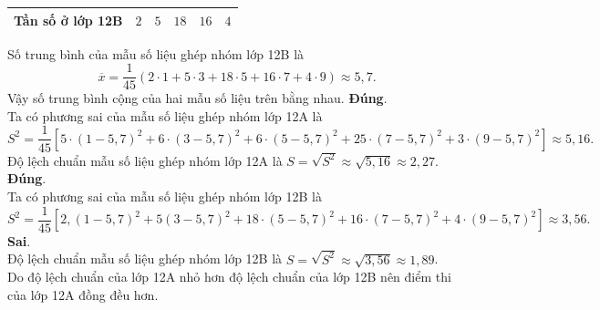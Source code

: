 \begin{ex}
{\begin{itemchoice}
\begin{center}
\begin{tabular}{|c|c|c|c|c|c|}
						\hline
						Tần số ở lớp 12B&$2$&$5$&$18$&$16$&$4$\\
						\hline			
					\end{tabular}
				\end{center}
				Số trung bình của mẫu số liệu ghép nhóm lớp 12B là				
				\[\overline{x}=\dfrac{1}{45}\left(2\cdot 1+5\cdot 3+18\cdot 5+16\cdot 7+4\cdot 9 \right)
				\approx 5{,}7.\]
				Vậy số trung bình cộng của hai mẫu số liệu trên bằng nhau.
				\itemch \textbf{Đúng}.\\
				Ta có phương sai của mẫu số liệu ghép nhóm lớp 12A là\\
				\[S^2=\dfrac{1}{45}\left[ 
				  5\cdot (1-5{,}7)^2
				+ 6\cdot (3-5{,}7)^2
				+ 6\cdot (5-5{,}7)^2
				+25\cdot (7-5{,}7)^2
				+ 3\cdot (9-5{,}7)^2 \right]
				\approx 5{,}16.\]
				Độ lệch chuẩn mẫu số liệu ghép nhóm lớp 12A là $S=\sqrt{S^2}\approx \sqrt{5{,}16}\approx 2{,}27$.
				\itemch \textbf{Đúng}.\\
				Ta có phương sai của mẫu số liệu ghép nhóm lớp 12B là
				\[S^2=\dfrac{1}{45}\left[ 2{,}(1-5{,}7)^2+5(3-5{,}7)^2+18\cdot (5-5{,}7)^2+16\cdot (7-5{,}7)^2+4\cdot (9-5{,}7)^2 \right]\approx 3{,}56.\]
				\itemch \textbf{Sai}.\\
				Độ lệch chuẩn mẫu số liệu ghép nhóm lớp 12B là $S=\sqrt{S^2}\approx \sqrt{3{,}56}\approx 1{,}89$.\\
				Do độ lệch chuẩn của lớp 12A nhỏ hơn độ lệch chuẩn của lớp 12B nên điểm thi của lớp 12A đồng đều hơn.
			\end{itemchoice}
}
\end{ex}


